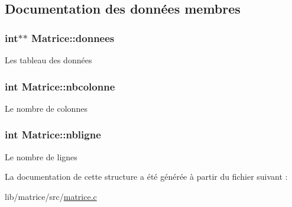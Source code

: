 \subsection{\-Documentation des données membres}
\hypertarget{structMatrice_a4ed59291b88d3ed8b30b3f74d4acf6b3}{
\subsubsection[{donnees}]{\setlength{\rightskip}{0pt plus 5cm}int$\ast$$\ast$ {\bf \-Matrice\-::donnees}}}\label{structMatrice_a4ed59291b88d3ed8b30b3f74d4acf6b3}
\-Les tableau des données \hypertarget{structMatrice_a7bf8157909d60e8ff841b26fc5cb2bab}{
\subsubsection[{nbcolonne}]{\setlength{\rightskip}{0pt plus 5cm}int {\bf \-Matrice\-::nbcolonne}}}\label{structMatrice_a7bf8157909d60e8ff841b26fc5cb2bab}
\-Le nombre de colonnes \hypertarget{structMatrice_a27d7f184cab0fce2a40e173afca96f9f}{
\subsubsection[{nbligne}]{\setlength{\rightskip}{0pt plus 5cm}int {\bf \-Matrice\-::nbligne}}}\label{structMatrice_a27d7f184cab0fce2a40e173afca96f9f}
\-Le nombre de lignes 

\-La documentation de cette structure a été générée à partir du fichier suivant \-:\begin{DoxyCompactItemize}
\item 
lib/matrice/src/\hyperlink{matrice_8c}{matrice.\-c}\end{DoxyCompactItemize}
